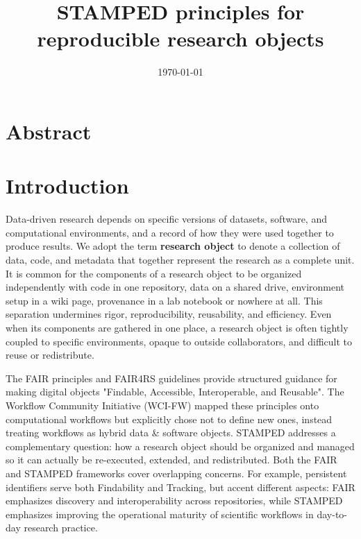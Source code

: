 \documentclass{article}
\title{STAMPED principles for reproducible research objects}
\date{\monthyeardate\today}
\makeatletter
\newcommand{\hyanchor}[1]{\texorpdfstring{\Hy@raisedlink{\hypertarget{#1}{}}}{}}
\newcommand{\anchoredsection}[2]{\section[#2]{\hyanchor{#1}#2}}
\makeatother
\begin{document}
\maketitle

\anchoredsection{abstract}{Abstract}


\anchoredsection{introduction}{Introduction}

Data-driven research depends on specific versions of datasets, software, and computational environments, and a record of how they were used together to produce results.
We adopt the term \textbf{research object} to denote a collection of data, code, and metadata that together represent the research as a complete unit.
It is common for the components of a research object to be organized independently with code in one repository, data on a shared drive, environment setup in a wiki page, provenance in a lab notebook or nowhere at all.
This separation undermines rigor, reproducibility, reusability, and efficiency.
Even when its components are gathered in one place, a research object is often tightly coupled to specific environments, opaque to outside collaborators, and difficult to reuse or redistribute.

The FAIR principles\cite{wilkinson_fair_2016} and FAIR4RS guidelines\cite{barker_introducing_2022} provide structured guidance for making digital objects "Findable, Accessible, Interoperable, and Reusable".
The Workflow Community Initiative (WCI-FW)\cite{wilkinson_applying_2025} mapped these principles onto computational workflows but explicitly chose not to define new ones, instead treating workflows as hybrid data \& software objects.
STAMPED addresses a complementary question: how a research object should be organized and managed so it can actually be re-executed, extended, and redistributed.
Both the FAIR and STAMPED frameworks cover overlapping concerns.
For example, persistent identifiers serve both Findability and Tracking, but accent different aspects: FAIR emphasizes discovery and interoperability across repositories, while STAMPED emphasizes improving the operational maturity of scientific workflows in day-to-day research practice.
\end{document}
